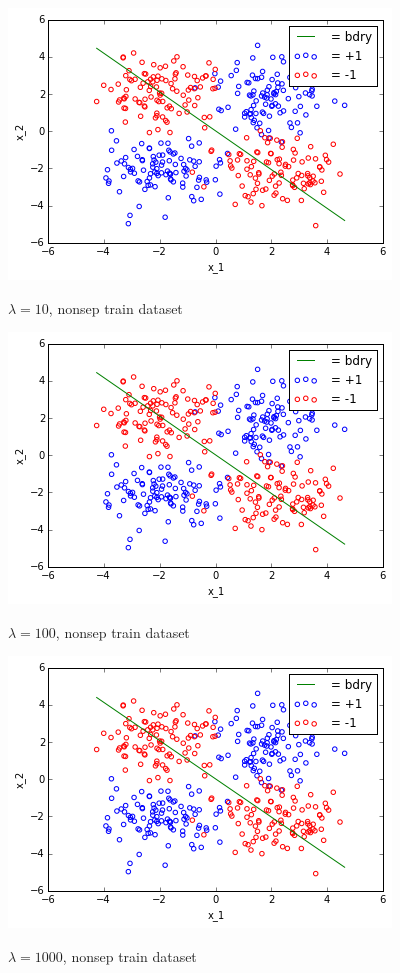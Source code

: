 \documentclass[10pt]{article}
\begin{document}
\begin{figure}
 \centering
 \includegraphics[scale=0.5]{nonsep_train_lam_10.png}
 \label{nonsep_train_lam_10}
 \caption{$\lambda = 10$, nonsep train dataset}
 \end{figure}
 \begin{figure}
 \centering
 \includegraphics[scale=0.5]{nonsep_train_lam_100.png}
 \label{nonsep_train_lam_100}
 \caption{$\lambda = 100$, nonsep train dataset}
 \end{figure}
 \begin{figure}
 \centering
 \includegraphics[scale=0.5]{nonsep_train_lam_1000.png}
 \label{nonsep_train_lam_1000}
 \caption{$\lambda = 1000$, nonsep train dataset}
 \end{figure}
\end{document}
